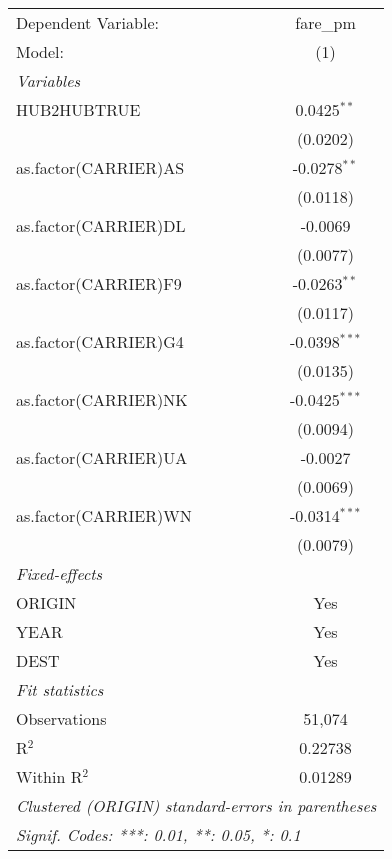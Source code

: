\documentclass{article}
\begin{document}
\begin{table}
    \begin{tabular}{lc}
       \tabularnewline \midrule \midrule
       Dependent Variable:  & fare\_pm\\   
       Model:               & (1)\\  
       \midrule
       \emph{Variables}\\
       HUB2HUBTRUE          & 0.0425$^{**}$\\   
                            & (0.0202)\\   
       as.factor(CARRIER)AS & -0.0278$^{**}$\\   
                            & (0.0118)\\   
       as.factor(CARRIER)DL & -0.0069\\   
                            & (0.0077)\\   
       as.factor(CARRIER)F9 & -0.0263$^{**}$\\   
                            & (0.0117)\\   
       as.factor(CARRIER)G4 & -0.0398$^{***}$\\   
                            & (0.0135)\\   
       as.factor(CARRIER)NK & -0.0425$^{***}$\\   
                            & (0.0094)\\   
       as.factor(CARRIER)UA & -0.0027\\   
                            & (0.0069)\\   
       as.factor(CARRIER)WN & -0.0314$^{***}$\\   
                            & (0.0079)\\   
       \midrule
       \emph{Fixed-effects}\\
       ORIGIN               & Yes\\  
       YEAR                 & Yes\\  
       DEST                 & Yes\\  
       \midrule
       \emph{Fit statistics}\\
       Observations         & 51,074\\  
       R$^2$                & 0.22738\\  
       Within R$^2$         & 0.01289\\  
       \midrule \midrule
       \multicolumn{2}{l}{\emph{Clustered (ORIGIN) standard-errors in parentheses}}\\
       \multicolumn{2}{l}{\emph{Signif. Codes: ***: 0.01, **: 0.05, *: 0.1}}\\
    \end{tabular}
    \end{table}
   
\end{document}
